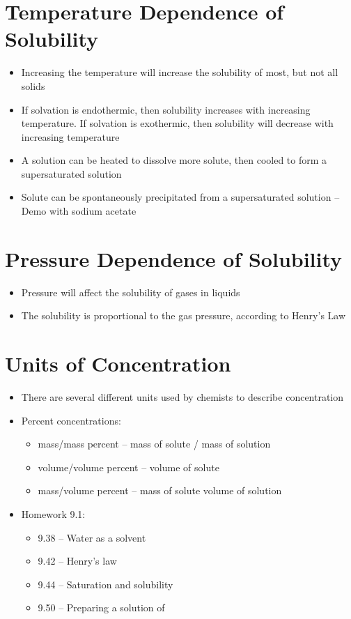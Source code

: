 \documentclass[12pt, openany, letterpaper]{memoir}
\begin{document}
\section{Temperature Dependence of Solubility}
\begin{itemize}
	\item Increasing the temperature will increase the solubility of most, but not all solids
	\item If solvation is endothermic, then solubility increases with increasing temperature. If solvation is exothermic, then solubility will decrease with increasing temperature
	\item A solution can be heated to dissolve more solute, then cooled to form a supersaturated solution
	\item Solute can be spontaneously precipitated from a supersaturated solution -- Demo with sodium acetate
\end{itemize}
\section{Pressure Dependence of Solubility}
\begin{itemize}
	\item Pressure will affect the solubility of gases in liquids
	\item The solubility is proportional to the gas pressure, according to Henry's Law
\end{itemize}
\section{Units of Concentration}
\begin{itemize}
	\item There are several different units used by chemists to describe concentration
	\item Percent concentrations:
	      \begin{itemize}
		      \item mass/mass percent -- mass of solute / mass of solution
		      \item volume/volume percent -- volume of solute
		      \item mass/volume percent -- mass of solute volume of solution
	      \end{itemize}
	\item Homework 9.1:
	      \begin{itemize}
		      \item 9.38 -- Water as a solvent
		      \item 9.42 -- Henry's law
		      \item 9.44 -- Saturation and solubility
		      \item 9.50 -- Preparing a solution of 
	      \end{itemize}
\end{itemize}
\end{document}
